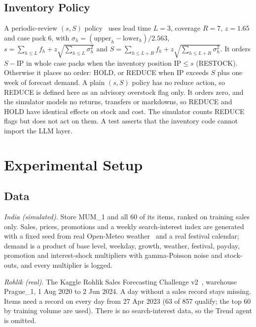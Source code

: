 \documentclass[conference]{IEEEtran}
\begin{document}
\subsection{Inventory Policy}
A periodic-review $(s,S)$ policy~\cite{silver2017} uses lead time $L=3$, coverage $R=7$, $z=1.65$
and case pack 6, with $\sigma_h=(\mathrm{upper}_h-\mathrm{lower}_h)/2.563$,
$s=\sum_{h\le L} f_h + z\sqrt{\sum_{h\le L}\sigma_h^2}$ and
$S=\sum_{h\le L+R} f_h + z\sqrt{\sum_{h\le L+R}\sigma_h^2}$. It orders $S-\mathrm{IP}$ in whole case
packs when the inventory position $\mathrm{IP}\le s$ (RESTOCK). Otherwise it places no order: HOLD,
or REDUCE when $\mathrm{IP}$ exceeds $S$ plus one week of forecast demand. A plain $(s,S)$ policy has
no reduce action, so REDUCE is defined here as an advisory overstock flag only. It orders zero, and
the simulator models no returns, transfers or markdowns, so REDUCE and HOLD have identical effects on
stock and cost. The simulator counts REDUCE flags but does not act on them. A test asserts that the inventory code cannot
import the LLM layer.

\section{Experimental Setup}\label{sec:setup}

\subsection{Data}
\emph{India (simulated).} Store MUM\_1 and all 60 of its items, ranked on training sales only.
Sales, prices, promotions and a weekly search-interest index are generated with a fixed seed from
real Open-Meteo weather~\cite{openmeteo} and a real festival calendar; demand is a product of base
level, weekday, growth, weather, festival, payday, promotion and interest-shock multipliers with
gamma-Poisson noise and stock-outs, and every multiplier is logged.

\emph{Rohlik (real).} The Kaggle Rohlik Sales Forecasting Challenge v2~\cite{rohlik}, warehouse
Prague\_1, 1 Aug 2020 to 2 Jun 2024. A day without a sales record stays missing. Items need a record
on every day from 27 Apr 2023 (63 of 857 qualify; the top 60 by training volume are used). There is
no search-interest data, so the Trend agent is omitted.
\end{document}

